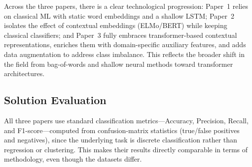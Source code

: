 \documentclass[a4paper,12pt]{article}
\begin{document}
Across the three papers, there is a clear technological progression: Paper~1 relies on classical ML with static word embeddings and a shallow LSTM; Paper~2 isolates the effect of contextual embeddings (ELMo/BERT) while keeping classical classifiers; and Paper~3 fully embraces transformer-based contextual representations, enriches them with domain-specific auxiliary features, and adds data augmentation to address class imbalance. This reflects the broader shift in the field from bag-of-words and shallow neural methods toward transformer architectures.


\subsection{Solution Evaluation}
All three papers use standard classification metrics---Accuracy, Precision, Recall, and F1-score---computed from confusion-matrix statistics (true/false positives and negatives), since the underlying task is discrete classification rather than regression or clustering. This makes their results directly comparable in terms of methodology, even though the datasets differ.
\end{document}
